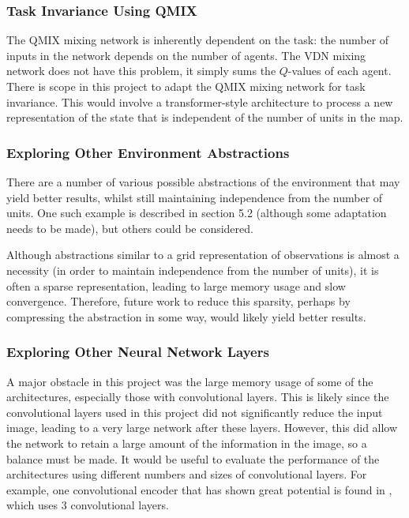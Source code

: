 \subsubsection{Task Invariance Using QMIX}

The QMIX mixing network is inherently dependent on the task: the number of inputs in the network depends on the number of agents. The VDN mixing network does not have this problem, it simply sums the $Q$-values of each agent. There is scope in this project to adapt the QMIX mixing network for task invariance. This would involve a transformer-style architecture to process a new representation of the state that is independent of the number of units in the map.


\subsubsection{Exploring Other Environment Abstractions}

There are a number of various possible abstractions of the environment that may yield better results, whilst still maintaining independence from the number of units. One such example is described in section 5.2 (although some adaptation needs to be made), but others could be considered. 

Although abstractions similar to a grid representation of observations is almost a necessity (in order to maintain independence from the number of units), it is often a sparse representation, leading to large memory usage and slow convergence. Therefore, future work to reduce this sparsity, perhaps by compressing the abstraction in some way, would likely yield better results.

\subsubsection{Exploring Other Neural Network Layers}

A major obstacle in this project was the large memory usage of some of the architectures, especially those with convolutional layers. This is likely since the convolutional layers used in this project did not significantly reduce the input image, leading to a very large network after these layers. However, this did allow the network to retain a large amount of the information in the image, so a balance must be made. It would be useful to evaluate the performance of the architectures using different numbers and sizes of convolutional layers. For example, one convolutional encoder that has shown great potential is found in \cite{natureencoder}, which uses 3 convolutional layers.

